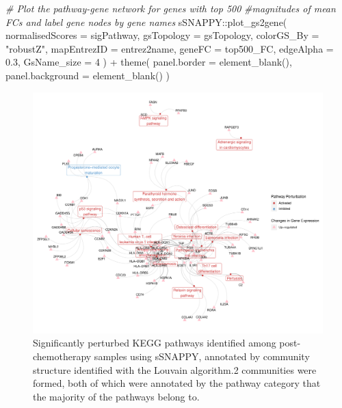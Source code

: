\documentclass[9pt,a4paper,]{extarticle}
\newenvironment{Shaded}{\begin{snugshade}}{\end{snugshade}}
\newcommand{\AttributeTok}[1]{\textcolor[rgb]{0.77,0.63,0.00}{#1}}
\newcommand{\CommentTok}[1]{\textcolor[rgb]{0.56,0.35,0.01}{\textit{#1}}}
\newcommand{\DecValTok}[1]{\textcolor[rgb]{0.00,0.00,0.81}{#1}}
\newcommand{\FloatTok}[1]{\textcolor[rgb]{0.00,0.00,0.81}{#1}}
\newcommand{\FunctionTok}[1]{\textcolor[rgb]{0.00,0.00,0.00}{#1}}
\newcommand{\NormalTok}[1]{#1}
\newcommand{\SpecialCharTok}[1]{\textcolor[rgb]{0.00,0.00,0.00}{#1}}
\newcommand{\StringTok}[1]{\textcolor[rgb]{0.31,0.60,0.02}{#1}}
\begin{document}
\begin{Shaded}
\begin{Highlighting}[]
\CommentTok{\# Plot the pathway{-}gene network for genes with top 500 }
\CommentTok{\#magnitudes of mean FCs and label gene nodes by gene names}
\NormalTok{sSNAPPY}\SpecialCharTok{::}\FunctionTok{plot\_gs2gene}\NormalTok{(}
    \AttributeTok{normalisedScores =}\NormalTok{ sigPathway, }
    \AttributeTok{gsTopology =}\NormalTok{ gsTopology, }
    \AttributeTok{colorGS\_By =} \StringTok{"robustZ"}\NormalTok{, }
    \AttributeTok{mapEntrezID =}\NormalTok{ entrez2name, }
    \AttributeTok{geneFC =}\NormalTok{ top500\_FC, }
    \AttributeTok{edgeAlpha =} \FloatTok{0.3}\NormalTok{, }
    \AttributeTok{GsName\_size =} \DecValTok{4}
\NormalTok{) }\SpecialCharTok{+}
    \FunctionTok{theme}\NormalTok{(}
        \AttributeTok{panel.border =} \FunctionTok{element\_blank}\NormalTok{(), }
        \AttributeTok{panel.background =} \FunctionTok{element\_blank}\NormalTok{()}
\NormalTok{)}
\end{Highlighting}
\end{Shaded}

\begin{figure}

{\centering \includegraphics[width=0.8\linewidth]{sSNAPPY_paper_files/figure-latex/Figure3-1} 

}

\caption{Significantly perturbed KEGG pathways identified among post-chemotherapy samples using sSNAPPY, annotated by community structure identified with the Louvain algorithm.2 communities were formed, both of which were annotated by the pathway category that the majority of the pathways belong to. }\label{fig:Figure3}
\end{figure}
\end{document}
